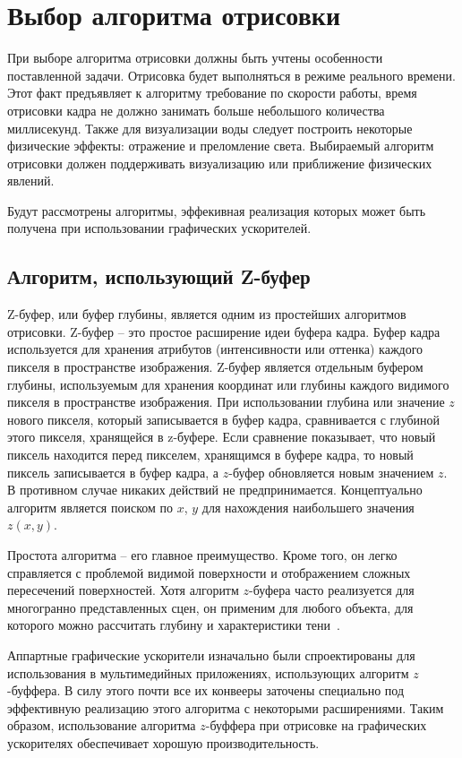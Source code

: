 \section{Выбор алгоритма отрисовки}

При выборе алгоритма отрисовки должны быть учтены особенности поставленной задачи.
Отрисовка будет выполняться в режиме реального времени. Этот факт 
предъявляет к алгоритму требование по скорости работы, время отрисовки кадра не должно занимать
больше небольшого количества миллисекунд. Также для визуализации воды следует построить
некоторые физические эффекты: отражение и преломление света. Выбираемый алгоритм отрисовки
должен поддерживать визуализацию или приближение физических явлений.

Будут рассмотрены алгоритмы, эффекивная реализация которых может быть получена при использовании
графических ускорителей. 

\subsection{Алгоритм, использующий Z-буфер}
Z-буфер, или буфер глубины, является одним из простейших алгоритмов отрисовки.
Z-буфер -- это простое расширение идеи буфера кадра. Буфер кадра используется 
для хранения атрибутов (интенсивности или оттенка) каждого пикселя в пространстве изображения. 
Z-буфер является отдельным буфером глубины, используемым для хранения координат или глубины 
каждого видимого пикселя в пространстве изображения. При использовании глубина или значение $z$ нового пикселя, 
который записывается в буфер кадра, сравнивается с глубиной этого пикселя, хранящейся в z-буфере. 
Если сравнение показывает, что новый пиксель находится перед пикселем, хранящимся в буфере кадра, 
то новый пиксель записывается в буфер кадра, а $z$-буфер обновляется новым значением $z$. 
В противном случае никаких действий не предпринимается. Концептуально алгоритм является поиском 
по $x$, $y$ для нахождения наибольшего значения $z(x, y)$.

Простота алгоритма -- его главное преимущество. Кроме того, он легко справляется с проблемой видимой 
поверхности и отображением сложных пересечений поверхностей. Хотя алгоритм $z$-буфера часто 
реализуется для многогранно представленных сцен, он применим для любого объекта, для 
которого можно рассчитать глубину и характеристики тени~\cite{Rodzhers}.

Аппартные графические ускорители изначально были спроектированы для использования в мультимедийных
приложениях, использующих алгоритм $z$-буффера. В силу этого почти все их конвееры заточены
специально под эффективную реализацию этого алгоритма с некоторыми расширениями. Таким образом,
использование алгоритма $z$-буффера при отрисовке на графических ускорителях обеспечивает
хорошую производительность.

